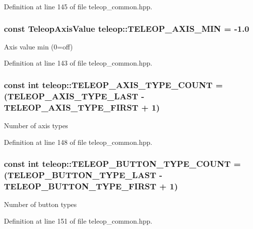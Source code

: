Definition at line 145 of file teleop\_\-common.hpp.

\subsubsection[{TELEOP\_\-AXIS\_\-MIN}]{\setlength{\rightskip}{0pt plus 5cm}const {\bf TeleopAxisValue} {\bf teleop::TELEOP\_\-AXIS\_\-MIN} = -\/1.0\hspace{0.3cm}{\ttfamily  [static]}}\label{namespaceteleop_aa9f9524c2d63470cc26a17fc4b9f7cb3}
Axis value min (0=off) 

Definition at line 143 of file teleop\_\-common.hpp.

\subsubsection[{TELEOP\_\-AXIS\_\-TYPE\_\-COUNT}]{\setlength{\rightskip}{0pt plus 5cm}const int {\bf teleop::TELEOP\_\-AXIS\_\-TYPE\_\-COUNT} = (TELEOP\_\-AXIS\_\-TYPE\_\-LAST -\/ TELEOP\_\-AXIS\_\-TYPE\_\-FIRST + 1)\hspace{0.3cm}{\ttfamily  [static]}}\label{namespaceteleop_a92a3d991740f795fc3f328bee57e455a}
Number of axis types 

Definition at line 148 of file teleop\_\-common.hpp.

\subsubsection[{TELEOP\_\-BUTTON\_\-TYPE\_\-COUNT}]{\setlength{\rightskip}{0pt plus 5cm}const int {\bf teleop::TELEOP\_\-BUTTON\_\-TYPE\_\-COUNT} = (TELEOP\_\-BUTTON\_\-TYPE\_\-LAST -\/ TELEOP\_\-BUTTON\_\-TYPE\_\-FIRST + 1)\hspace{0.3cm}{\ttfamily  [static]}}\label{namespaceteleop_a23f29b5821a25e5ab3d40d549f7ca9d6}
Number of button types 

Definition at line 151 of file teleop\_\-common.hpp.


